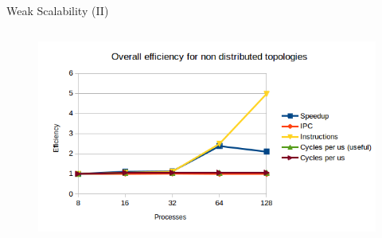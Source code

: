 \documentclass[aspectratio=169]{bredelebeamer}
\begin{document}
\begin{frame}{Weak Scalability (II)}
\begin{columns}
\begin{figure}[h!]
\centering
\includegraphics[width=\textwidth, keepaspectratio=1]{"./img/basic_analysis/overallEfficiency_nonDistributed"}
\end{figure}


\end{columns}

\end{frame}
\end{document}
